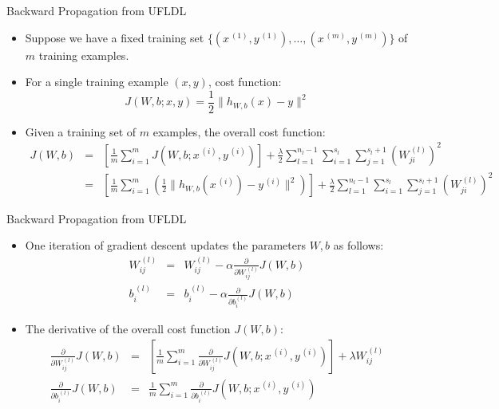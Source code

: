 \documentclass[10pt]{beamer}
\begin{document}
	\begin{frame}{Backward Propagation from UFLDL}
		\begin{itemize}
			\item Suppose we have a fixed training set $\{(x^{\,(1)},y^{\,(1)}),\dots,(x^{\,(m)},y^{\,(m)})\}$ of $m$ training examples.
			\item For a single training example $(x, y)$, cost function:
			$$J(W,b;x,y)=\frac{1}{2}\lVert h_{W,b}(x)-y\rVert^2$$
			\item Given a training set of $m$ examples, the overall cost function:
			\begin{eqnarray*}
				J(W,b)&=&\left[\frac{1}{m}\sum_{i=1}^mJ(W,b;x^{\,(i)},y^{\,(i)})\right]+\frac{\lambda}{2}\sum_{l=1}^{n_l-1}\sum_{i=1}^{s_l}\sum_{j=1}^{s_l+1}\left(W_{ji}^{\,(l)}\right)^2\\
				&=&\left[\frac{1}{m}\sum_{i=1}^m\left(\frac{1}{2}\lVert h_{W,b}(x^{\,(i)})-y^{\,(i)}\rVert^2\right)\right]+\frac{\lambda}{2}\sum_{l=1}^{n_l-1}\sum_{i=1}^{s_l}\sum_{j=1}^{s_l+1}\left(W_{ji}^{\,(l)}\right)^2
			\end{eqnarray*}
		\end{itemize}
	\end{frame}

	\begin{frame}{Backward Propagation from UFLDL}
		\begin{itemize}
			\item One iteration of gradient descent updates the parameters $W, b$ as follows:
			\begin{eqnarray*}
				W_{ij}^{\,(l)}&=&W_{ij}^{\,(l)}-\alpha\frac{\partial}{\partial W_{ij}^{\,(l)}}J(W,b)\\
				b_i^{\,(l)}&=&b_i^{\,(l)}-\alpha\frac{\partial}{\partial b_i^{(l)}}J(W,b)
			\end{eqnarray*}
			\item The derivative of the overall cost function $J(W,b)$:
			\begin{eqnarray*}
				\frac{\partial}{\partial W_{ij}^{\,(l)}}J(W,b)&=&\left[\frac{1}{m}\sum_{i=1}^m\frac{\partial}{\partial W_{ij}^{\,(l)}}J(W,b;x^{\,(i)},y^{\,(i)})\right]+\lambda W_{ij}^{\,(l)}\\
				\frac{\partial}{\partial b_i^{\,(l)}}J(W,b)&=&\frac{1}{m}\sum_{i=1}^m\frac{\partial}{\partial b_i^{\,(l)}}J(W,b;x^{\,(i)},y^{\,(i)})
			\end{eqnarray*}
		\end{itemize}
	\end{frame}
\end{document}
